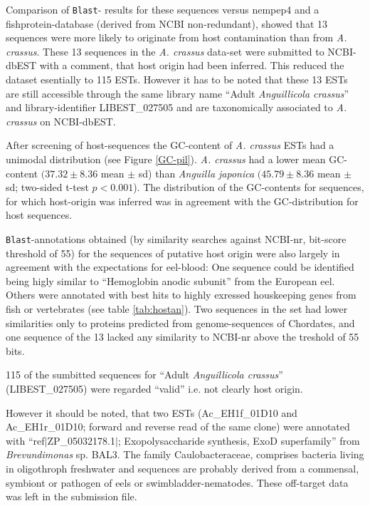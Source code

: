Comparison of \texttt{Blast}- results for these sequences versus
nempep4 and a fishprotein-database (derived from NCBI non-redundant),
showed that 13 sequences were more likely to originate from host
contamination than from \textit{A. crassus}. These 13 sequences in the
\textit{A. crassus} data-set were submitted to NCBI-dbEST with a
comment, that host origin had been inferred. This reduced the dataset
esentially to 115 ESTs. However it has to be noted that these 13 ESTs
are still accessible through the same library name ``Adult
\textit{Anguillicola crassus}'' and library-identifier LIBEST\_027505
and are taxonomically associated to \textit{A. crassus} on NCBI-dbEST.


After screening of host-sequences the GC-content of
\textit{A. crassus} ESTs had a unimodal distribution (see Figure
\ref{GC-pil}). \textit{A. crassus} had a lower mean GC-content $(37.32
\pm 8.36$ mean $\pm$ sd) than \textit{Anguilla japonica} $(45.79 \pm
8.36$ mean $\pm$ sd; two-sided t-test $p<0.001$). The distribution of
the GC-contents for sequences, for which host-origin was inferred was
in agreement with the GC-distribution for host sequences.

\texttt{Blast}-annotations obtained (by similarity searches against
NCBI-nr, bit-score threshold of 55) for the sequences of putative host
origin were also largely in agreement with the expectations for
eel-blood: One sequence could be identified being higly similar to
``Hemoglobin anodic subunit'' from the European eel. Others were
annotated with best hits to highly exressed houskeeping genes from
fish or vertebrates (see table \ref{tab:hostan}). Two sequences in the
set had lower similarities only to proteins predicted from
genome-sequences of Chordates, and one sequence of the 13 lacked any
similarity to NCBI-nr above the treshold of 55 bits.

115 of the sumbitted sequences for ``Adult \textit{Anguillicola
  crassus}'' (LIBEST\_027505) were regarded ``valid'' i.e. not clearly
host origin. 

However it should be noted, that two ESTs (Ac\_EH1f\_01D10 and
Ac\_EH1r\_01D10; forward and reverse read of the same clone) were
annotated with ``ref$|$ZP\_05032178.1$|$; Exopolysaccharide synthesis,
ExoD superfamily'' from \textit{Brevundimonas} sp. BAL3. The family
Caulobacteraceae, comprises bacteria living in oligothroph freshwater
and sequences are probably derived from a commensal, symbiont or
pathogen of eels or swimbladder-nematodes. These off-target data was
left in the submission file.

